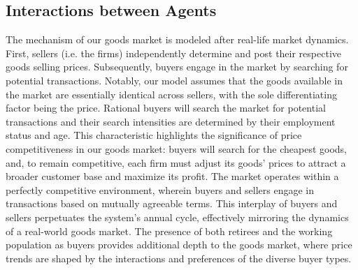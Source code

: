 \documentclass[ %
    final,
    scrbook,
    listoffigures,
    listoftables, 
    glossary]{cu-thesis}
\begin{document}
\subsection{Interactions between Agents}\label{alg}
The mechanism of our goods market is modeled after real-life market dynamics. First, sellers (i.e. the firms) independently determine and post their respective goods selling prices. Subsequently, buyers engage in the market by searching for potential transactions. Notably, our model assumes that the goods available in the market are essentially identical across sellers, with the sole differentiating factor being the price. 
Rational buyers will search the market for potential transactions and their search intensities are determined by their employment status and age.
This characteristic highlights the significance of price competitiveness in our goods market: buyers will search for the cheapest goods, and, to remain competitive, each firm must adjust its goods' prices to attract a broader customer base and maximize its profit.
The market operates within a perfectly competitive environment, wherein buyers and sellers engage in transactions based on mutually agreeable terms. This interplay of buyers and sellers perpetuates the system's annual cycle, effectively mirroring the dynamics of a real-world goods market. The presence of both retirees and the working population as buyers provides additional depth to the goods market, where price trends are shaped by the interactions and preferences of the diverse buyer types.

\iffalse
The population within the model undergoes dynamic changes over time. It commences with an initial population that includes children and young adults. As individuals age, they transition from childhood to young adulthood and eventually enter the labor market at the age of 15. Workers within the population may retire after reaching the age of 65, at which point they cease participating in the labor market but continue to engage as buyers in the goods market. Additionally, retiree agents may pass away based on a constant mortality rate, affecting both the retiree and working population within the buyer agents. Births occur continuously, maintaining a relatively stable population size. The ABM accounts for these demographic changes as agents age, retire, and, in some cases, leave the population due to mortality.
\fi
\end{document}
